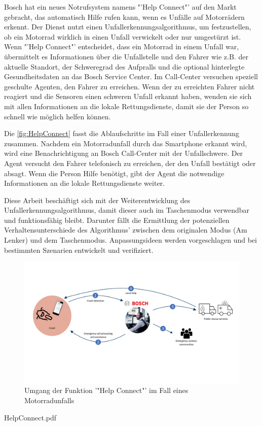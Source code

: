 Bosch hat ein neues Notrufsystem namens "'Help Connect"' auf den Markt gebracht, das automatisch Hilfe rufen kann, wenn es Unfälle auf Motorrädern erkennt.
Der Dienst nutzt einen Unfallerkennungsalgorithmus, um festzustellen, ob ein Motorrad wirklich in einen Unfall verwickelt oder nur umgestürzt ist.
Wenn "'Help Connect"' entscheidet, dass ein Motorrad in einem Unfall war, übermittelt es Informationen über die Unfallstelle und den Fahrer wie z.B. der aktuelle Standort, der Schweregrad des Aufpralls und die optional hinterlegte Gesundheitsdaten an das Bosch Service Center.
Im Call-Center versuchen speziell geschulte Agenten, den Fahrer zu erreichen. Wenn der zu erreichten Fahrer nicht reagiert und die Sensoren einen schweren Unfall erkannt haben, wenden sie sich mit allen Informationen an die lokale Rettungsdienste, damit sie der Person so schnell wie möglich helfen können.

Die \autoref{fig:HelpConnect} fasst die Ablaufschritte im Fall einer Unfallerkennung zusammen. Nachdem ein Motorradunfall durch das Smartphone erkannt wird, wird eine Benachrichtigung an Bosch Call-Center mit der Unfallschwere. Der Agent versucht den Fahrer telefonisch zu erreichen, der den Unfall bestätigt oder absagt. Wenn die Person Hilfe benötigt, gibt der Agent die notwendige Informationen an die lokale Rettungsdienste weiter.

Diese Arbeit beschäftigt sich mit der Weiterentwicklung des Unfallerkennungsalgorithmus, damit dieser auch im Taschenmodus verwendbar und funktionsfähig bleibt. Darunter fällt die Ermittlung der potenziellen Verhaltensunterschiede des Algorithmus' zwischen dem originalen Modus (Am Lenker) und dem Taschenmodus. Anpassungsideen werden vorgeschlagen und bei bestimmten Szenarien entwickelt und verifiziert.

\begin{figure}
	\centering
	\includegraphics[width=\linewidth]{Bilder/HelpConnect.pdf}
	\caption{Umgang der Funktion '"Help Connect"' im Fall eines Motorradunfalls}
	\label{fig:HelpConnect}
\end{figure}


HelpConnect.pdf












